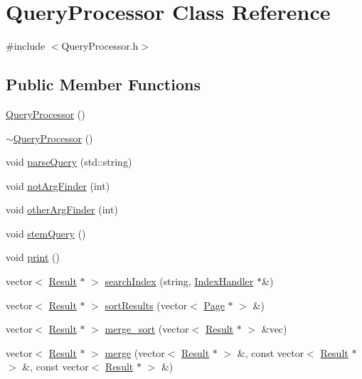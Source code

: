 \hypertarget{class_query_processor}{}\section{Query\+Processor Class Reference}
\label{class_query_processor}


{\ttfamily \#include $<$Query\+Processor.\+h$>$}

\subsection*{Public Member Functions}
\begin{DoxyCompactItemize}
\item 
\hyperlink{class_query_processor_a32a6760ff0aab51b38fb8eb236e2e140}{Query\+Processor} ()
\item 
\hyperlink{class_query_processor_ac4bebae67b0c08004f26f55957428574}{$\sim$\+Query\+Processor} ()
\item 
void \hyperlink{class_query_processor_a87834efeca2f9af6e32fb5a545d33067}{parse\+Query} (std\+::string)
\item 
void \hyperlink{class_query_processor_a5b1b684b03f82b2ef8137ce630be7c33}{not\+Arg\+Finder} (int)
\item 
void \hyperlink{class_query_processor_af6b62a64663cd688f4a55d66570a28a2}{other\+Arg\+Finder} (int)
\item 
void \hyperlink{class_query_processor_a00cadfdc04ae5a048c58cbd9e7eebb1a}{stem\+Query} ()
\item 
void \hyperlink{class_query_processor_abc27ce568c2aa6cd84cfc10bca4b803b}{print} ()
\item 
vector$<$ \hyperlink{class_result}{Result} $\ast$ $>$ \hyperlink{class_query_processor_a740190335d4102760624782105eebb32}{search\+Index} (string, \hyperlink{class_index_handler}{Index\+Handler} $\ast$\&)
\item 
vector$<$ \hyperlink{class_result}{Result} $\ast$ $>$ \hyperlink{class_query_processor_a04a0adb83cbedd2bf62f3822fe84d4c1}{sort\+Results} (vector$<$ \hyperlink{class_page}{Page} $\ast$ $>$ \&)
\item 
vector$<$ \hyperlink{class_result}{Result} $\ast$ $>$ \hyperlink{class_query_processor_a67bcf8c5a79e7522ade1efdad7e11984}{merge\+\_\+sort} (vector$<$ \hyperlink{class_result}{Result} $\ast$ $>$ \&vec)
\item 
vector$<$ \hyperlink{class_result}{Result} $\ast$ $>$ \hyperlink{class_query_processor_a320de974504e3897b91950486e532f14}{merge} (vector$<$ \hyperlink{class_result}{Result} $\ast$ $>$ \&, const vector$<$ \hyperlink{class_result}{Result} $\ast$ $>$ \&, const vector$<$ \hyperlink{class_result}{Result} $\ast$ $>$ \&)
\end{DoxyCompactItemize}


